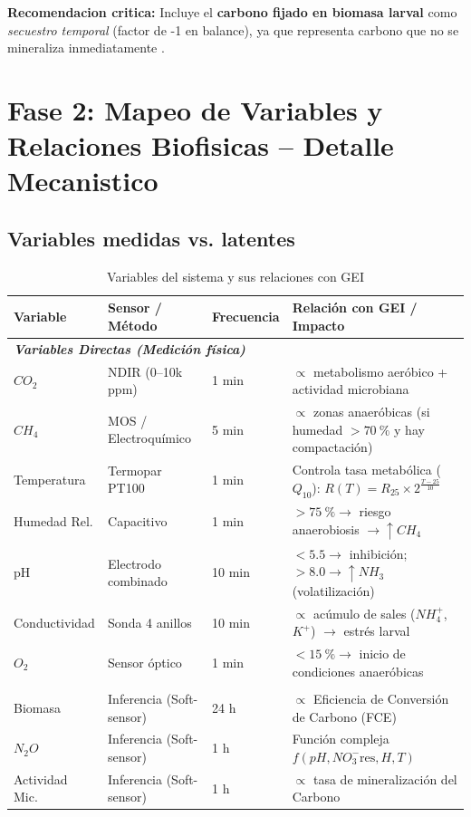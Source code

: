 \documentclass[12pt]{article}
\begin{document}
\noindent\textbf{Recomendacion critica:} Incluye el \textbf{carbono fijado en biomasa larval} como \textit{secuestro temporal} (factor de -1 en balance), ya que representa carbono que no se mineraliza inmediatamente \cite{ref56}.

\newpage

\section{Fase 2: Mapeo de Variables y Relaciones Biofisicas -- Detalle Mecanistico}

\subsection{Variables medidas vs. latentes}

\begin{table}[H]
\centering
\small %
\caption{Variables del sistema y sus relaciones con GEI}
\label{tab:variables_gei}
\begin{tabularx}{\textwidth}{@{} l l l X @{}}
\toprule
\textbf{Variable} & \textbf{Sensor / Método} & \textbf{Frecuencia} & \textbf{Relación con GEI / Impacto} \\
\midrule

\multicolumn{4}{l}{\textit{\textbf{Variables Directas (Medición física)}}} \\
$CO_2$ & NDIR (0--10k ppm) & 1 min & $\propto$ metabolismo aeróbico + actividad microbiana \\
$CH_4$ & MOS / Electroquímico & 5 min & $\propto$ zonas anaeróbicas (si humedad $>\SI{70}{\percent}$ y hay compactación) \\
Temperatura & Termopar PT100 & 1 min & Controla tasa metabólica ($Q_{10}$): $R(T) = R_{25} \times 2^{\frac{T-25}{10}}$ \\
Humedad Rel. & Capacitivo & 1 min & $>\SI{75}{\percent} \rightarrow$ riesgo anaerobiosis $\rightarrow \uparrow CH_4$ \\
pH & Electrodo combinado & 10 min & $<5.5 \rightarrow$ inhibición; $>8.0 \rightarrow \uparrow NH_3$ (volatilización) \\
Conductividad & Sonda 4 anillos & 10 min & $\propto$ acúmulo de sales ($NH_4^+$, $K^+$) $\rightarrow$ estrés larval \\
$O_2$ & Sensor óptico & 1 min & $<\SI{15}{\percent} \rightarrow$ inicio de condiciones anaeróbicas \\

\addlinespace %

\multicolumn{4}{l}{\textit{\textbf{Variables Latentes (Inferidas vía PGNN)}}} \\
Biomasa & Inferencia (Soft-sensor) & 24 h & $\propto$ Eficiencia de Conversión de Carbono (FCE) \\
$N_2O$ & Inferencia (Soft-sensor) & 1 h & Función compleja $f(pH, NO_3^-\text{res}, H, T)$ \\
Actividad Mic. & Inferencia (Soft-sensor) & 1 h & $\propto$ tasa de mineralización del Carbono \\
\bottomrule
\end{tabularx}
\end{table}
\end{document}
